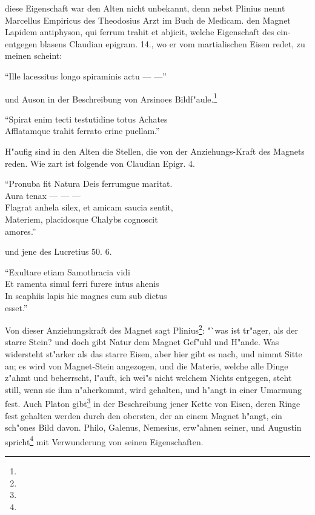 \documentclass[a4paper, 11pt, oneside, polutonikogreek, german]{article}
\begin{document}
diese Eigenschaft war den Alten nicht unbekannt, denn nebst Plinius nennt Marcellus Empiricus des Theodosius Arzt im Buch de Medicam. den Magnet Lapidem antiphyson, qui ferrum trahit et abjicit, welche Eigenschaft des ein-entgegen blasens Claudian epigram. 14., wo er vom martialischen Eisen redet, zu meinen scheint:

"`Ille lacessitus longo spiraminis actu --- ---"'

und Auson in der Beschreibung von Arsinoes Bildf"aule.\footnote{}

"`Spirat enim tecti testutidine totus Achates\\
\hspace*{0.5cm} Afflatamque trahit ferrato crine puellam."'

H"aufig sind in den Alten die Stellen, die von der Anziehungs-Kraft des Magnets reden. Wie zart ist folgende von Claudian Epigr. 4.

"`Pronuba fit Natura Deis ferrumgue maritat.\\
\hspace*{0.5cm} Aura tenax --- --- ---\\
\hspace*{0.5cm} Flagrat anhela silex, et amicam saucia sentit,\\
\hspace*{0.5cm} Materiem, placidosque Chalybs cognoscit\\
\hspace*{1.5cm} amores."'

und jene des Lucretius 50. 6.

"`Exultare etiam Samothracia vidi\\
\hspace*{0.5cm} Et ramenta simul ferri furere intus ahenis\\
\hspace*{0.5cm} In scaphiis lapis hic magnes cum sub dictus\\
\hspace*{1.5cm} esset."'

Von dieser Anziehungskraft des Magnet sagt Plinius\footnote{}: "`was ist tr"ager, als der starre Stein? und doch gibt Natur dem Magnet Gef"uhl und H"ande. Was widersteht st"arker als das starre Eisen, aber hier gibt es nach, und nimmt Sitte an; es wird von Magnet-Stein angezogen, und die Materie, welche alle Dinge z"ahmt und beherrscht, l"auft, ich wei"s nicht welchem Nichts entgegen, steht still, wenn sie ihm n"aherkommt, wird gehalten, und h"angt in einer Umarmung fest. Auch Platon gibt\footnote{} in der Beschreibung jener Kette von Eisen, deren Ringe fest gehalten werden durch den obersten, der an einem Magnet h"angt, ein sch"ones Bild davon. Philo, Galenus, Nemesius, erw"ahnen seiner, und Augustin spricht\footnote{} mit Verwunderung von seinen Eigenschaften.
\end{document}
